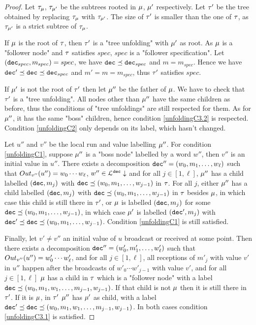 \ifproofs
\begin{proof}
		Let $\tau_{\mu}$, $\tau_{\mu'}$ be the subtrees rooted in $\mu$, $\mu'$ respectively. 
	Let $\tau'$ be the tree obtained by replacing $\tau_{\mu}$ with $\tau_{\mu'}$. The size of $\tau'$ is smaller than the one of $\tau$, as $\tau_{\mu'}$ is a strict subtree of $\tau_{\mu}$.
	
	If $\mu$ is the root of $\tau$, then $\tau'$ is a "tree unfolding" with $\mu'$ as root. As $\mu$ is a "follower node" and $\tau$ satisfies $spec$, $spec$ is a "follower specification". Let $(\mathtt{dec}_{spec}, m_{spec}) = spec$, we have $\mathtt{dec} \preceq \mathtt{dec}_{spec}$ and $m = m_{spec}$. 
	Hence we have $\mathtt{dec}' \preceq \mathtt{dec} \preceq \mathtt{dec}_{spec}$ and $m' = m = m_{spec}$, thus $\tau'$ satisfies $spec$.
	
	If  $\mu'$ is not the root of $\tau'$ then let $\mu''$ be the father of $\mu$. We have to check that $\tau'$ is a "tree unfolding". 
	All nodes other than $\mu''$ have the same children as before, thus the conditions of "tree unfoldings" are still respected for them.
	As for $\mu''$, it has the same "boss" children, hence condition \ref{unfoldingC3.2} is respected. Condition \ref{unfoldingC2} only depends on its label, which hasn't changed.
	
	Let $u''$ and $v''$ be the local run and value labelling $\mu''$.
	For condition \ref{unfoldingC1}, suppose $\mu''$ is a "boss node" labelled by a word $w''$, then $v''$ is an initial value in $u''$. There exists a decomposition $\mathtt{dec}'' = (w_0, m_1, \ldots, w_\ell)$ such that $\voutput{v''}{u''} = w_0\cdots w_\ell$, $w''\in \mathcal{L}^{\mathtt{\mathtt{dec}}}\downarrow$ and for all $j \in [1,\ell]$, $\mu''$ has a child labelled $(\mathtt{dec},m_j)$ with $\mathtt{dec} \preceq (w_0, m_1, \ldots, w_{j-1})$ in $\tau$.
	For all $j$, either $\mu''$ has a child labelled $(\mathtt{dec},m_j)$ with $\mathtt{dec} \preceq (w_0, m_1, \ldots, w_{j-1})$ in $\tau$ besides $\mu$, in which case this child is still there in $\tau'$, or $\mu$ is labelled $(\mathtt{dec},m_j)$ for some $\mathtt{dec} \preceq (w_0, m_1, \ldots, w_{j-1})$, in which case $\mu'$ is labelled $(\mathtt{dec}', m_j)$ with  $\mathtt{dec}' \preceq \mathtt{dec} \preceq (w_0, m_1, \ldots, w_{j-1})$.
	Condition \ref{unfoldingC1} is still satisfied.
	
	Finally, let $v' \neq v''$ an initial value of $u$ broadcast or received at some point.
	Then there exists a decomposition $\mathtt{dec}'' = (w'_0, m'_1, \ldots, w'_\ell)$ such that $\voutput{v''}{u''} = w'_0\cdots w'_\ell$, and for all $j \in [1,\ell]$, all receptions of $m'_j$ with value $v'$ in $u''$ happen after the broadcasts of $w'_0\cdots w'_{j-1}$ with value $v'$, and for all $j \in [1,\ell]$ $\mu$ has a child in $\tau$ which is a "follower node" with a label $\mathtt{dec} \preceq (w_0, m_1, w_1, \ldots, m_{j-1}, w_{j-1})$.
	If that child is not $\mu$ then it is still there in $\tau'$. If it is $\mu$, in $\tau'$ $\mu''$ has $\mu'$ as child, with a label $\mathtt{dec}' \preceq \mathtt{dec} \preceq (w_0, m_1, w_1, \ldots, m_{j-1}, w_{j-1})$.
	In both cases condition \ref{unfoldingC3.1} is satisfied.
	

\end{proof}
